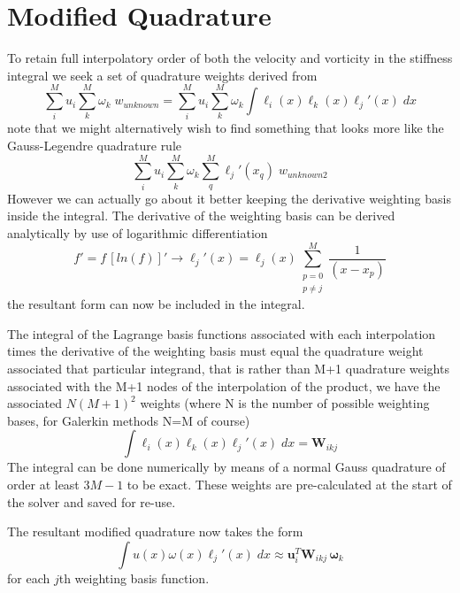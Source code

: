 \documentclass[letterpaper,12pt]{report}
\newcommand{\be}{\begin{equation}}
\newcommand{\ben}[1]{\begin{equation}\label{#1}}
\newcommand{\ee}{\end{equation}}
\begin{document}
\section{Modified Quadrature}
To retain full interpolatory order of both the velocity and vorticity in the stiffness integral we seek a set of quadrature weights derived from
\be \sum_i^M u_i \sum_k^M \omega_k \;w_{unknown} = \sum_i^M u_i \sum_k^M \omega_k \int \ell_i(x) \ell_k(x) \ell_j'(x) \;dx \ee
note that we might alternatively wish to find something that looks more like the Gauss-Legendre quadrature rule
\be \sum_i^M u_i \sum_k^M \omega_k \sum_q^M \ell_j'(x_q) \;w_{unknown2} \ee
However we can actually go about it better keeping the derivative weighting basis inside the integral.
The derivative of the weighting basis can be derived analytically by use of logarithmic differentiation
\be f' = f \, [ln(f)]' \rightarrow \ell_j'(x)=\ell_j(x) \sum_{\substack{p=0\\ p\neq j}}^M \frac{1}{(x-x_p)} \ee
the resultant form can now be included in the integral.

The integral of the Lagrange basis functions associated with each interpolation times the derivative of the weighting basis must equal the quadrature weight associated that particular integrand, that is rather than M+1  quadrature weights associated with the M+1 nodes of the interpolation of the product, we have the associated $N(M+1)^2$ weights (where N is the number of possible weighting bases, for Galerkin methods N=M of course)
\be \int \ell_i(x) \ell_k(x) \ell_j'(x) \;dx = \mathbf{W}_{ikj} \ee
The integral can be done numerically by means of a normal Gauss quadrature of order at least $3M-1$ to be exact. These weights are pre-calculated at the start of the solver and saved for re-use.

The resultant modified quadrature now takes the form
\ben{modQuad} \int u(x) \omega(x) \ell_j'(x) \;dx \approx \mathbf{u}_i^T \mathbf{W}_{ikj} \, \boldsymbol{\omega}_k \ee
for each $j$th weighting basis function.
\end{document}
